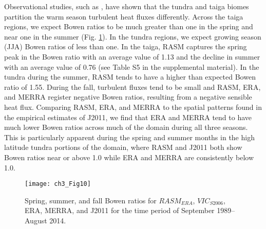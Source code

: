 Observational studies, such as \citet{Beringer_2005}, have shown that the tundra and taiga biomes partition the warm season turbulent heat fluxes differently.
Across the taiga regions, we expect Bowen ratios to be much greater than one in the spring and near one in the summer (Fig. \ref{fig:bowen}).
In the tundra regions, we expect growing season (JJA) Bowen ratios of less than one.
In the taiga, RASM captures the spring peak in the Bowen ratio with an average value of 1.13 and the decline in summer with an average value of 0.76 (see Table S5 in the supplemental material).
In the tundra during the summer, RASM tends to have a higher than expected Bowen ratio of 1.55.
During the fall, turbulent fluxes tend to be small and RASM, ERA, and MERRA register negative Bowen ratios, resulting from a negative sensible heat flux.
Comparing RASM, ERA, and MERRA to the spatial patterns found in the empirical estimates of J2011, we find that ERA and MERRA tend to have much lower Bowen ratios across much of the domain during all three seasons.
This is particularly apparent during the spring and summer months in the high latitude tundra portions of the domain, where RASM and J2011 both show Bowen ratios near or above 1.0 while ERA and MERRA are consistently below 1.0.

\begin{figure}
  \centering
  \texttt{[image: ch3\_Fig10]}
  \caption{Spring, summer, and fall Bowen ratios for $RASM_{ERA}$, $VIC_{S2006}$, ERA, MERRA, and J2011 for the time period of September 1989–August 2014.}
  \label{fig:bowen}
\end{figure}

